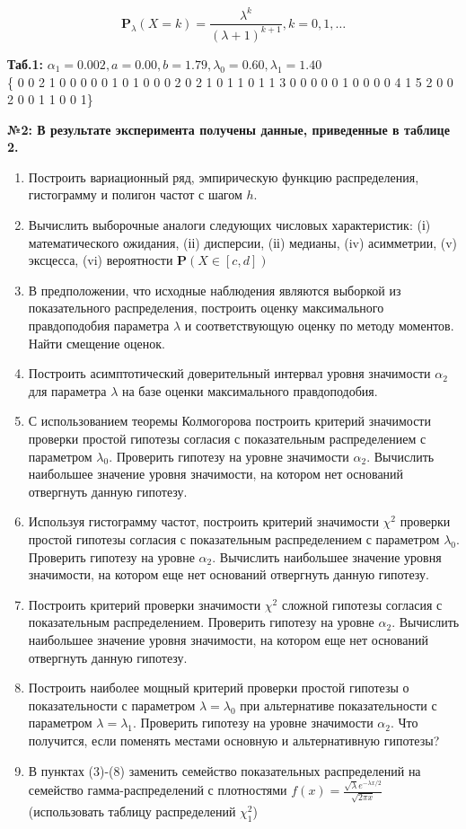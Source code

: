 \documentclass[areasetadvanced]{scrartcl}
\begin{document}
\[\textbf{P}_\lambda(X = k) = \frac{\lambda^k}{(\lambda+1)^{k+1}}, k = 0,1,\dots\]

\textbf{Таб.1: } $\alpha_1 = 0.002, a = 0.00, b = 1.79, \lambda_0 = 0.60, \lambda_1 = 1.40$\\
\{ 0 0 2 1 0 0 0 0 0 1 0 1 0 0 0 2 0 2 1 0 1 1 0 1 1 3 0 0 0 0 0 1 0 0 0 0 4 1 5 2 0 0 2 0 0 1 1 0 0 1\}

\textbf{№2:
В результате эксперимента получены данные, приведенные в таблице 2.}
\begin{enumerate}
	\item Построить вариационный ряд, эмпирическую функцию распределения, гистограмму и полигон частот с шагом $h$.
	\item Вычислить выборочные аналоги следующих числовых характеристик:
	(і) математического ожидания, (іі) дисперсии, (іі) медианы, (iv) асимметрии, (v) эксцесса,
	(vi) вероятности $\textbf{P}(X \in [c,d])$
	\item В предположении, что исходные наблюдения являются выборкой из показательного распределения, построить оценку максимального правдоподобия параметра $\lambda$ и соответствующую оценку по методу моментов. Найти смещение оценок.
	\item Построить асимптотический доверительный интервал уровня значимости $\alpha_2$ для параметра $\lambda$ на базе оценки максимального правдоподобия.
	\item С использованием теоремы Колмогорова построить критерий значимости проверки простой гипотезы согласия с показательным распределением с параметром $\lambda_0$. Проверить гипотезу на уровне значимости $\alpha_2$. Вычислить наибольшее значение уровня значимости, на котором нет оснований отвергнуть данную гипотезу.
	\item Используя гистограмму частот, построить критерий значимости $\chi^2$ проверки простой гипотезы согласия с показательным распределением с параметром $\lambda_0$. Проверить гипотезу на уровне $\alpha_2$. Вычислить наибольшее значение уровня значимости, на котором еще нет оснований отвергнуть данную гипотезу.
	\item Построить критерий проверки значимости $\chi^2$ сложной гипотезы согласия с показательным распределением.
	Проверить гипотезу на уровне $\alpha_2$. Вычислить наибольшее значение уровня значимости, на котором еще нет оснований отвергнуть данную гипотезу.
	\item Построить наиболее мощный критерий проверки простой гипотезы о показательности с параметром $\lambda = \lambda_0$ при альтернативе показательности с параметром $\lambda = \lambda_1$. Проверить гипотезу на уровне значимости $\alpha_2$. Что получится, если поменять местами основную и альтернативную гипотезы?
	\item В пунктах (3)-(8) заменить семейство показательных распределений на семейство гамма-распределений с плотностями $f(x) = \frac{\sqrt\lambda  e^{-\lambda x/2}}{\sqrt{2\pi x}}$ (использовать таблицу распределений $\chi_1^2$)
\end{enumerate}
\end{document}
